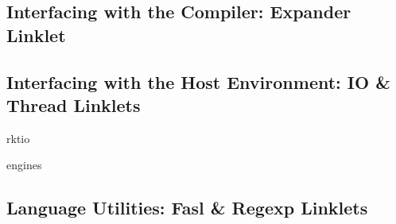 		\subsection{Interfacing with the Compiler: Expander Linklet}

		\subsection{Interfacing with the Host Environment: IO \& Thread Linklets}
			\begin{todo}[TODO]
				rktio
			\end{todo}
			\begin{todo}[TODO]
				engines
			\end{todo}
		\subsection{Language Utilities: Fasl \& Regexp Linklets}

